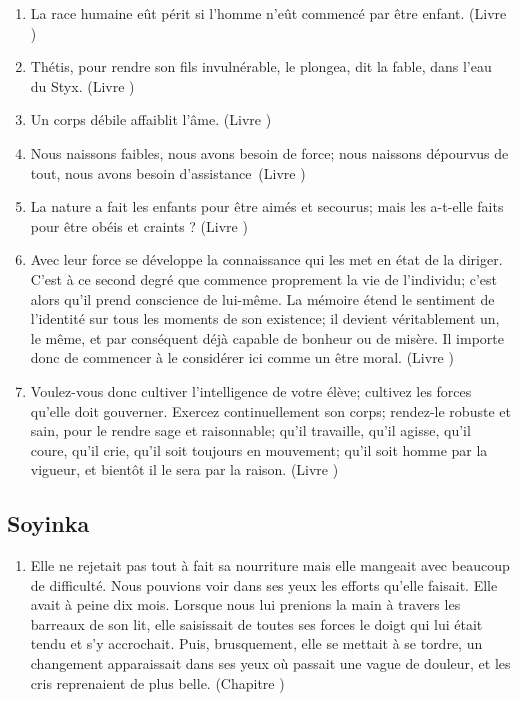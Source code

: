 \documentclass[a4paper, 11pt, hidelinks]{article}
\newcommand{\rb}[1]{\Romanbar{#1}}
\begin{document}
\begin{enumerate}
    \item La race humaine eût périt si l'homme n'eût commencé par être enfant. (Livre \rb{1})
    \item Thétis, pour rendre son fils invulnérable, le plongea, dit la fable, dans l'eau du Styx. (Livre \rb{1})
    \item Un corps débile affaiblit l'âme. (Livre \rb{1})
    \item Nous naissons faibles, nous avons besoin de force; nous naissons dépourvus de tout, nous avons besoin d'assistance (Livre \rb{1})
    \item La nature a fait les enfants pour être aimés et secourus; mais les a-t-elle faits pour être obéis et craints ? (Livre \rb{2})
    \item Avec leur force se développe la connaissance qui les met en état de la diriger. C'est à ce second degré que commence proprement la vie de l'individu; c'est alors qu'il prend conscience de lui-même. La mémoire étend le sentiment de l'identité sur tous les moments de son existence; il devient véritablement un, le même, et par conséquent déjà capable de bonheur ou de misère. Il importe donc de commencer à le considérer ici comme un être moral. (Livre \rb{2})
    \item Voulez-vous donc cultiver l'intelligence de votre élève; cultivez les forces qu'elle doit gouverner. Exercez continuellement son corps; rendez-le robuste et sain, pour le rendre sage et raisonnable; qu'il travaille, qu'il agisse, qu'il coure, qu'il crie, qu'il soit toujours en mouvement; qu'il soit homme par la vigueur, et bientôt il le sera par la raison. (Livre \rb{2})
\end{enumerate}



\subsection{Soyinka}


\begin{enumerate}
    \item Elle ne rejetait pas tout à fait sa nourriture mais elle mangeait avec beaucoup de difficulté. Nous pouvions voir dans ses yeux les efforts qu'elle faisait. Elle avait à peine dix mois. Lorsque nous lui prenions la main à travers les barreaux de son lit, elle saisissait de toutes ses forces le doigt qui lui était tendu et s'y accrochait. Puis, brusquement, elle se mettait à se tordre, un changement apparaissait dans ses yeux où passait une vague de douleur, et les cris reprenaient de plus belle. (Chapitre \rb{7})
\end{enumerate}
\end{document}
